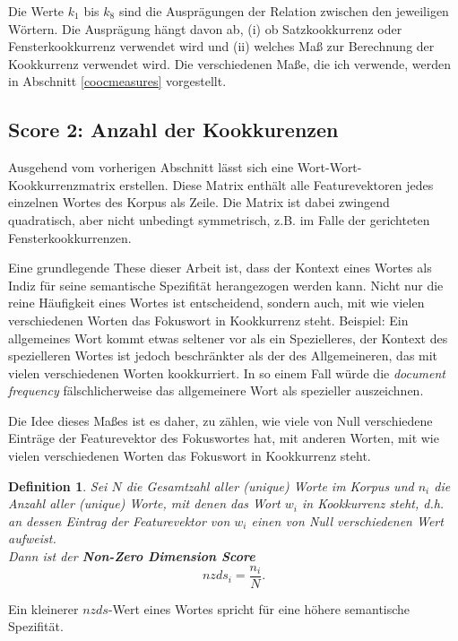 \documentclass[11pt,numbers=noenddot]{scrartcl}
\newtheorem*{defi}{Definition}
\begin{document}
Die Werte $k_1$ bis $k_8$ sind die Ausprägungen der Relation zwischen den jeweiligen Wörtern. Die Ausprägung hängt davon ab, (i) ob Satzkookkurrenz oder Fensterkookkurrenz verwendet wird und (ii) welches Maß zur Berechnung der Kookkurrenz verwendet wird. Die verschiedenen Maße, die ich verwende, werden in Abschnitt \ref{coocmeasures} vorgestellt.

\subsection{Score 2: Anzahl der Kookkurenzen} \label{nzds}

Ausgehend vom vorherigen Abschnitt lässt sich eine Wort-Wort-Kookkurrenzmatrix erstellen. Diese Matrix enthält alle Featurevektoren jedes einzelnen Wortes des Korpus als Zeile. Die Matrix ist dabei zwingend quadratisch, aber nicht unbedingt symmetrisch, z.B. im Falle der gerichteten Fensterkookkurrenzen.

Eine grundlegende These dieser Arbeit ist, dass der Kontext eines Wortes als Indiz für seine semantische Spezifität herangezogen werden kann. Nicht nur die reine Häufigkeit eines Wortes ist entscheidend, sondern auch, mit wie vielen verschiedenen Worten das Fokuswort in Kookkurrenz steht. Beispiel: Ein allgemeines Wort kommt etwas seltener vor als ein Spezielleres, der Kontext des spezielleren Wortes ist jedoch beschränkter als der des Allgemeineren, das mit vielen verschiedenen Worten kookkurriert. In so einem Fall würde die \emph{document frequency} fälschlicherweise das allgemeinere Wort als spezieller auszeichnen.

Die Idee dieses Maßes ist es daher, zu zählen, wie viele von Null verschiedene Einträge der Featurevektor des Fokuswortes hat, mit anderen Worten, mit wie vielen verschiedenen Worten das Fokuswort in Kookkurrenz steht.

\begin{defi}
Sei $N$ die Gesamtzahl aller (unique) Worte im Korpus und $n_i$ die Anzahl aller (unique) Worte, mit denen das Wort $w_i$ in Kookkurrenz steht, d.h. an dessen Eintrag der Featurevektor von $w_i$ einen von Null verschiedenen Wert aufweist. \\ Dann ist der \textbf{Non-Zero Dimension Score}
\begin{equation}
    nzds_i = \frac{n_i}{N}.
\end{equation}
\end{defi}

Ein kleinerer $nzds$-Wert eines Wortes spricht für eine höhere semantische Spezifität.
\end{document}
